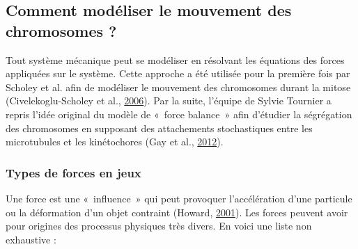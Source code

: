 \documentclass[12pt,a4paper,twoside,openright]{book}
\begin{document}
\subsection{Comment modéliser le mouvement des chromosomes
?}\label{comment-moduxe9liser-le-mouvement-des-chromosomes}

Tout système mécanique peut se modéliser en résolvant les équations des
forces appliquées sur le système. Cette approche a été utilisée pour la
première fois par Scholey et al. afin de modéliser le mouvement des
chromosomes durant la mitose (Civelekoglu-Scholey et al.,
\protect\hyperlink{ref-Civelekoglu-Scholey2006}{2006}). Par la suite,
l'équipe de Sylvie Tournier a repris l'idée original du modèle de
«~force balance~» afin d'étudier la ségrégation des chromosomes en
supposant des attachements stochastiques entre les microtubules et les
kinétochores (Gay et al., \protect\hyperlink{ref-Gay2012a}{2012}).

\subsubsection{Types de forces en jeux}\label{types-de-forces-en-jeux}

Une force est une «~influence~» qui peut provoquer l'accélération d'une
particule ou la déformation d'un objet contraint (Howard,
\protect\hyperlink{ref-Howard2001}{2001}). Les forces peuvent avoir pour
origines des processus physiques très divers. En voici une liste non
exhaustive :
\end{document}
